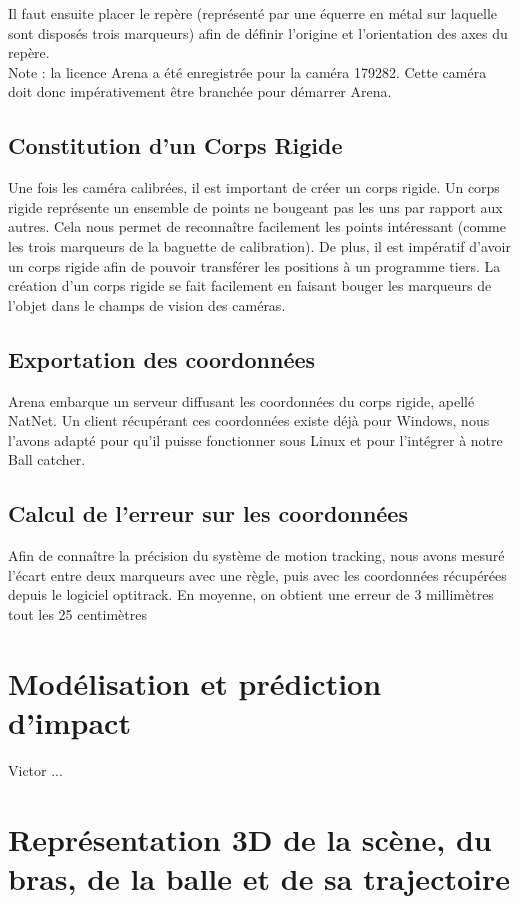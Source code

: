 \documentclass{article}[11pt]
\begin{document}
Il faut ensuite placer le repère (représenté par une équerre en métal sur laquelle sont disposés trois marqueurs) afin de définir l'origine et l'orientation des axes du repère.\\

Note : la licence Arena a été enregistrée pour la caméra 179282. Cette caméra doit donc impérativement être branchée pour démarrer Arena.

\subsection{Constitution d'un Corps Rigide}

Une fois les caméra calibrées, il est important de créer un corps rigide.
Un corps rigide représente un ensemble de points ne bougeant pas les uns par rapport aux autres. Cela nous permet de reconnaître facilement les points intéressant (comme les trois marqueurs de la baguette de calibration). De plus, il est impératif d'avoir un corps rigide afin de pouvoir transférer les positions à un programme tiers. La création d'un corps rigide se fait facilement en faisant bouger les marqueurs de l'objet dans le champs de vision des caméras.

\subsection{Exportation des coordonnées}

Arena embarque un serveur diffusant les coordonnées du corps rigide, apellé NatNet. Un client récupérant ces coordonnées existe déjà pour Windows, nous l'avons adapté pour qu'il puisse fonctionner sous Linux et pour l'intégrer à notre Ball catcher. 

\subsection{Calcul de l'erreur sur les coordonnées}
Afin de connaître la précision du système de motion tracking, nous avons mesuré l'écart entre deux marqueurs avec une règle, puis avec les coordonnées récupérées depuis le logiciel optitrack. En moyenne, on obtient une erreur de 3 millimètres tout les 25 centimètres 

\section{Modélisation et prédiction d'impact}
Victor ...

\section{Représentation 3D de la scène, du bras, de la balle et de sa trajectoire}
\end{document}
